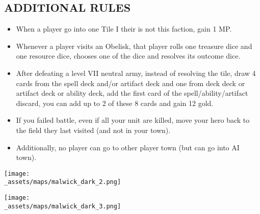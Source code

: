 \begin{multicols*}{2}
\subsection*{\MakeUppercase{Additional Rules}}
\begin{itemize}
    \item When a player go into one Tile I their is not this faction, gain 1 MP.
    \item Whenever a player visits an Obelisk, that player rolls one treasure dice and one resource dice, chooses one of the dice and resolves its outcome dice.
    \item After defeating a level VII neutral army, instead of resolving the tile, draw 4 cards from the spell deck and/or artifact deck and one from deck deck or artifact deck or ability deck, add the first card of the spell/ability/artifact discard, you can add up to 2 of these 8 cards and gain 12 gold.
    \item If you failed battle, even if all your unit are killed, move your hero back to the field they last visited (and not in your town).
    \item Additionally, no player can go to other player town (but can go into AI town).
\end{itemize}

\texttt{[image: \\\_assets/maps/malwick\_dark\_2.png]}
\vspace{3em}

\end{multicols*}

\begin{center}
    \texttt{[image: \\\_assets/maps/malwick\_dark\_3.png]}
\end{center}
